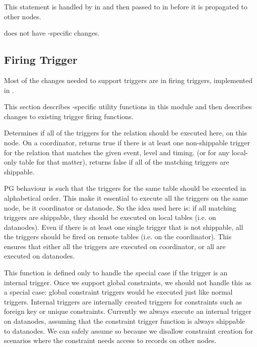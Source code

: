   This statement is handled by  in  and then passed to
   in  before it is propagated to other nodes.
  
   does not have \XC-specific changes.



\subsection{Firing Trigger}

  Most of the changes needed to support triggers are in firing triggers, implemented in
  .
  
  This section describes \XC-specific utility functions in this module and then describes
  changes to existing trigger firing functions.




  Determines if all of the triggers for the relation should be executed
  here, on this node.
  On a coordinator, returns true if there is at least one non-shippable trigger for the relation
  that matches the given event, level and timing.
  (or for any local-only table for that matter), returns false if all of the matching triggers
  are shippable.
  
  PG behaviour is such that the triggers for the same table should be executed in
  alphabetical order.
  This make it essential to execute all the triggers on the same node, be it coordinator or
  datanode.
  So the idea used here is: if all matching triggers are shippable, they should be executed on local
  tables (i.e. on datanodes).
  Even if there is at least one single trigger that is not shippable, all the triggers should be fired on remote
  tables (i.e. on the coordinator).
  This ensures that either all the triggers are executed on coordinator, or all are executed on
  datanodes.




This function is defined only to handle the special case if the trigger is an internal trigger.
Once we support global constraints, we should not handle this as a special case:
global constraint triggers would be executed just like normal triggers.
Internal triggers are internally created triggers for constraints such as foreign key or
unique constraints.
Currently we always execute an internal trigger on datanodes, assuming that the constraint
trigger function is always shippable to datanodes.
We can safely assume so because we disallow constraint creation for scenarios where the
constraint needs access to records on other nodes.


